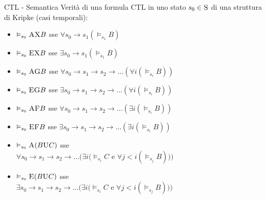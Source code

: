 \documentclass{beamer}
\begin{document}
\begin{frame}{CTL - Semantica}
    Verità di una formula CTL in uno stato $s_0 \in \textsc{S}$ di una struttura di Kripke (casi temporali):
    \medskip
    \begin{itemize}
        \item $\vDash_{s_0} \textsc{AX}B$ \hspace{2em} sse \hspace{2em} $\forall s_0 \to s_1 (\vDash_{s_1} B)$
        \item $\vDash_{s_0} \textsc{EX}B$ \hspace{2em} sse \hspace{2em} $\exists s_0 \to s_1 (\vDash_{s_1} B)$\smallskip

        \item $\vDash_{s_0} \textsc{AG}B$ \hspace{2em} sse \hspace{2em} $\forall s_0 \to s_1 \to s_2 \to \dots (\forall i (\vDash_{s_i} B))$
        \item $\vDash_{s_0} \textsc{EG}B$ \hspace{2em} sse \hspace{2em} $\exists s_0 \to s_1 \to s_2 \to \dots (\forall i (\vDash_{s_i} B))$\smallskip

        \item $\vDash_{s_0} \textsc{AF}B$ \hspace{2em} sse \hspace{2em} $\forall s_0 \to s_1 \to s_2 \to \dots (\exists i (\vDash_{s_i} B))$
        \item $\vDash_{s_0} \textsc{EF}B$ \hspace{2em} sse \hspace{2em} $\exists s_0 \to s_1 \to s_2 \to \dots (\exists i (\vDash_{s_i} B))$\smallskip

        \item $\vDash_{s_0} \textsc{A}(B\textsc{U}C)$ \hspace{2em} sse \\\hspace{2em}$\forall s_0 \to s_1 \to s_2 \to \dots (\exists i (\vDash_{s_i} C $ e $ \forall j < i (\vDash_{s_j} B)))$
        \item $\vDash_{s_0} \textsc{E}(B\textsc{U}C)$ \hspace{2em} sse \\\hspace{2em}$\exists s_0 \to s_1 \to s_2 \to \dots (\exists i (\vDash_{s_i} C $ e $ \forall j < i (\vDash_{s_j} B)))$
    \end{itemize}
\end{frame}
\end{document}
